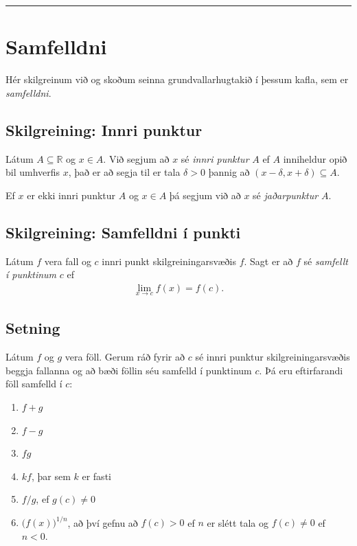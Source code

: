 \documentclass[b5paper,11pt,icelandic]{sphinxmanual}
\begin{document}

\bigskip\hrule{}\bigskip



\section{Samfelldni}
\label{kafli02:samfelldni}\label{kafli02:id11}
Hér skilgreinum við og skoðum seinna grundvallarhugtakið í þessum kafla, sem er \textit{samfelldni}.


\subsection{Skilgreining: Innri punktur}
\label{kafli02:skilgreining-innri-punktur}\label{kafli02:index-7}
Látum \(A\subseteq {{\mathbb  R}}\) og \(x\in A\). Við segjum að
\(x\) sé \textit{innri punktur} \(A\) ef \(A\) inniheldur opið bil
umhverfis \(x\), það er að segja til er tala \(\delta>0\) þannig
að \((x-\delta, x+\delta)\subseteq
A\).

Ef \(x\) er ekki innri punktur \(A\) og \(x\in A\) þá segjum
við að \(x\) sé \textit{jaðarpunktur} \(A\).


\subsection{Skilgreining: Samfelldni í punkti}
\label{kafli02:skilgreining-samfelldni-i-punkti}\label{kafli02:index-8}
Látum \(f\) vera fall og \(c\) innri punkt skilgreiningarsvæðis
\(f\). Sagt er að \(f\) sé \emph{samfellt í punktinum} \(c\) ef
\begin{equation*}
\begin{split}\lim_{x\rightarrow c}f(x)=f(c).\end{split}
\end{equation*}

\subsection{Setning}
\label{kafli02:id12}
Látum \(f\) og \(g\) vera föll. Gerum ráð fyrir að \(c\) sé
innri punktur skilgreiningarsvæðis beggja fallanna og að bæði föllin séu
samfelld í punktinum \(c\). Þá eru eftirfarandi föll samfelld í
\(c\):
\begin{enumerate}
\item {} 
\(f+g\)

\item {} 
\(f-g\)

\item {} 
\(fg\)

\item {} 
\(kf\), þar sem \(k\) er fasti

\item {} 
\(f/g\), ef \(g(c)\neq 0\)

\item {} 
\(\Big(f(x)\Big)^{1/n}\), að því gefnu að \(f(c)>0\) ef
\(n\) er slétt tala og \(f(c)\neq 0\) ef \(n<0\).

\end{enumerate}
\end{document}
